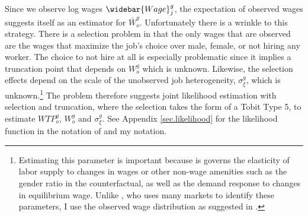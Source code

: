 \documentclass[12pt]{article}
\begin{document}
Since we observe log wages $\widebar{Wage}^g_j$, the expectation of observed wages suggests itself as an estimator for $\bar{W}^g_o$. Unfortunately there is a wrinkle to this strategy. There is a selection problem in that the only wages that are observed are the wages that maximize the job's choice over male, female, or not hiring any worker. The choice to not hire at all is especially problematic since it implies a truncation point that depends on $W^g_o$ which is unknown. Likewise, the selection effects depend on the scale of the unobserved job heterogeneity, $\sigma^g_\xi $, which is unknown.\footnote{Estimating this parameter is important because is governs the elasticity of labor supply to changes in wages or other non-wage amenities such as the gender ratio in the counterfactual, as well as the demand response to changes in equilibrium wage. Unlike , who uses many markets to identify these parameters, I use the observed wage distribution as suggested in .} The problem therefore suggests joint likelihood estimation with selection and truncation, where the selection takes the form of a Tobit Type 5, to estimate $WTP^g_o$, $W^g_o$ and $\sigma^g_{\xi}$. See Appendix \ref{sec.likelihood} for the likelihood function in the notation of  and my notation.





%
%
\end{document}
